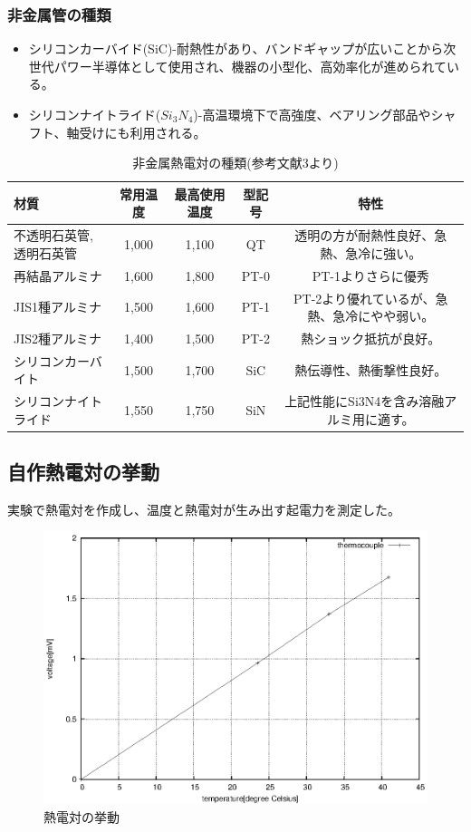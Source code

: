 \documentclass[a4j,twoside,openright,11pt]{jarticle}
\begin{document}
\subsubsection{非金属管の種類}
\begin{itemize}
\item シリコンカーバイド(SiC)-耐熱性があり、バンドギャップが広いことから次世代パワー半導体として使用され、機器の小型化、高効率化が進められている。
\item シリコンナイトライド($Si_3N_4$)-高温環境下で高強度、ベアリング部品やシャフト、軸受けにも利用される。
\end{itemize}
\begin{table}[htbp]
\begin{center}
\small
  \caption{非金属熱電対の種類(参考文献3より)}
  \begin{tabular}{l|c|c|c|c}
\hline
材質&常用温度&最高使用温度&型記号&特性\\
\hline
\hline
不透明石英管,透明石英管&1,000&1,100&QT&透明の方が耐熱性良好、急熱、急冷に強い。\\
再結晶アルミナ&1,600&1,800&PT-0&PT-1よりさらに優秀\\
JIS1種アルミナ&1,500&1,600&PT-1&PT-2より優れているが、急熱、急冷にやや弱い。\\
JIS2種アルミナ&1,400&1,500&PT-2&熱ショック抵抗が良好。\\
シリコンカーバイト&1,500&1,700&SiC&熱伝導性、熱衝撃性良好。\\
シリコンナイトライド&1,550&1,750&SiN&上記性能にSi3N4を含み溶融アルミ用に適す。\\
\hline
  \end{tabular}
\normalsize
\end{center}
\end{table}
\subsection{自作熱電対の挙動}
実験で熱電対を作成し、温度と熱電対が生み出す起電力を測定した。
\begin{figure}[htbp]
\begin{center}
\includegraphics[width=12cm]{./netudentui/data.eps}
\end{center}
\caption{熱電対の挙動}
\end{figure}
\end{document}
